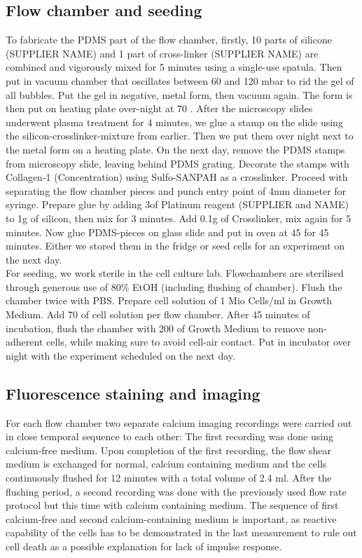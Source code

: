 \subsection{Flow chamber and seeding}
\label{sec:FluidicModel}
To fabricate the PDMS part of the flow chamber, firstly, 10 parts of silicone (SUPPLIER NAME) and 1 part of cross-linker (SUPPLIER NAME) are combined and vigorously mixed for 5 minutes using a single-use spatula. Then put in vacuum chamber that oscillates between 60 and 120 mbar to rid the gel of all bubbles. Put the gel in negative, metal form, then vacuum again. The form is then put on heating plate over-night at 70 \degC{}. After the microscopy slides underwent plasma treatment for 4 minutes, we glue a stamp on the slide using the silicon-crosslinker-mixture from earlier. Then we put them over night next to the metal form on a heating plate. On the next day, remove the PDMS stamps from microscopy slide, leaving behind PDMS grating. Decorate the stamps with Collagen-1 (Concentration) using Sulfo-SANPAH as a crosslinker. Proceed with separating the flow chamber pieces and punch entry point of 4mm diameter for syringe. Prepare glue by adding 3\mul of Platinum reagent (SUPPLIER and NAME) to 1g of silicon, then mix for 3 minutes. Add 0.1g of Crosslinker, mix again for 5 minutes. Now glue PDMS-pieces on glass slide and put in oven at 45 \degC{} for 45 minutes. Either we stored them in the fridge or seed cells for an experiment on the next day.\\
For seeding, we work sterile in the cell culture lab. Flowchambers are sterilised through generous use of 80\% EtOH (including flushing of chamber). Flush the chamber twice with PBS. Prepare cell solution of 1 Mio Cells/ml in Growth Medium. Add 70 \mul{} of cell solution per flow chamber. After 45 minutes of incubation, flush the chamber with 200\mul{} of Growth Medium to remove non-adherent cells, while making sure to avoid cell-air contact. Put in incubator over night with the experiment scheduled on the next day.

\subsection{Fluorescence staining and imaging}
\label{sec:LiveImaging}

For each flow chamber two separate calcium imaging recordings were carried out in close temporal sequence to each other: The first recording was done using calcium-free medium. Upon completion of the first recording, the flow shear medium is exchanged for normal, calcium containing medium and the cells continuously flushed for 12 minutes with a total volume of 2.4 ml. After the flushing period, a second recording was done with the previously used flow rate protocol but this time with calcium containing medium. The sequence of first calcium-free and second calcium-containing medium is important, as reactive capability of the cells has to be demonstrated in the last measurement to rule out cell death as a possible explanation for lack of impulse response. 

